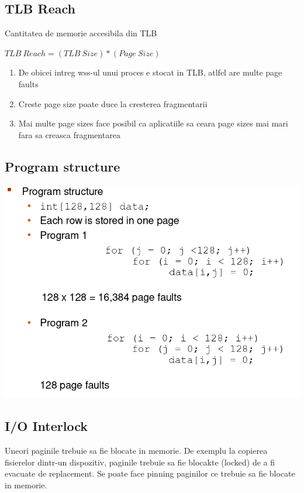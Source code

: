\documentclass{article}
\begin{document}
\subsection*{TLB Reach}
Cantitatea de memorie accesibila din TLB
\begin{center}
    \begin{math}
        TLB\ Reach = (TLB\ Size) * (Page\ Size)
    \end{math}
\end{center}
\begin{enumerate}
    \item De obicei intreg wss-ul unui proces e stocat in TLB, atlfel are multe page faults
    \item Creste page size poate duce la cresterea fragmentarii
    \item Mai multe page sizes face posibil ca aplicatiile sa ceara page sizes mai mari fara sa creasca fragmentarea
\end{enumerate}

\subsection*{Program structure}
\begin{center}
    \includegraphics[scale=0.4]{40-progstruct.png}
\end{center}

\subsection*{I/O Interlock}
Uneori paginile trebuie sa fie blocate in memorie. De exemplu la copierea fisierelor dintr-un dispozitiv, paginile trebuie sa fie blocakte (locked) de a fi evacuate de replacement. Se poate face pinning paginilor ce trebuie sa fie blocate in memorie.
\end{document}
